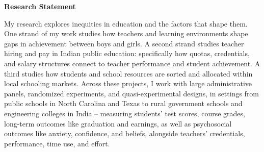 \documentclass[letter,10pt]{article}
\begin{document}
\thispagestyle{firstpage} %
\begin{center}
    \textbf{\large{Research Statement}}
\end{center}

My research explores inequities in education and the factors that shape them. One strand of my work studies how teachers and learning environments shape gaps in achievement between boys and girls. A second strand studies teacher hiring and pay in Indian public education: specifically how quotas, credentials, and salary structures connect to teacher performance and student achievement. A third studies how students and school resources are sorted and allocated within local schooling markets. Across these projects, I work with large administrative panels, randomized experiments, and quasi-experimental designs, in settings from public schools in North Carolina and Texas to rural government schools and engineering colleges in India -- measuring students' test scores, course grades, long-term outcomes like graduation and earnings, as well as psychosocial outcomes like anxiety, confidence, and beliefs, alongside teachers' credentials, performance, time use, and effort.
\end{document}
